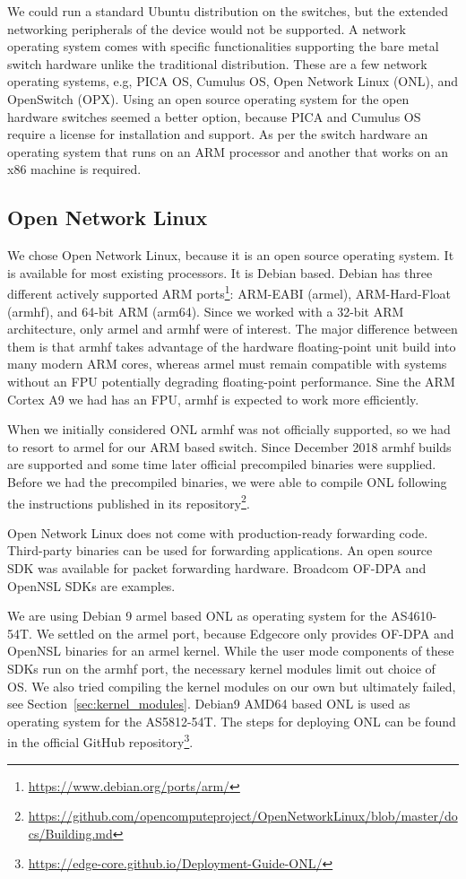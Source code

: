 \documentclass[a4paper]{article}
\begin{document}
We could run a standard Ubuntu distribution on the switches, but the extended networking peripherals of the device would not be supported. A network operating system comes with specific functionalities supporting the bare metal switch hardware unlike the traditional distribution. These are a few network operating systems, e.g, PICA OS, Cumulus OS, Open Network Linux (ONL), and OpenSwitch (OPX). Using an open source operating system for the open hardware switches seemed a better option, because PICA and Cumulus OS require a license for installation and support. As per the switch hardware an operating system that runs on an ARM processor and another that works on an x86 machine is required.

\subsection{Open Network Linux}
We chose Open Network Linux, because it is an open source operating system. It is available for most existing processors. It is Debian based. Debian has three different actively supported ARM ports\footnote{\url{https://www.debian.org/ports/arm/}}: ARM-EABI (armel), ARM-Hard-Float (armhf), and 64-bit ARM (arm64). Since we worked with a 32-bit ARM architecture, only armel and armhf were of interest. The major difference between them is that armhf takes advantage of the hardware floating-point unit build into many modern ARM cores, whereas armel must remain compatible with systems without an FPU potentially degrading floating-point performance. Sine the ARM Cortex A9 we had has an FPU, armhf is expected to work more efficiently.

When we initially considered ONL armhf was not officially supported, so we had to resort to armel for our ARM based switch. Since December 2018 armhf builds are supported and some time later official precompiled binaries were supplied. Before we had the precompiled binaries, we were able to compile ONL following the instructions published in its repository\footnote{\url{https://github.com/opencomputeproject/OpenNetworkLinux/blob/master/docs/Building.md}}.

Open Network Linux does not come with production-ready forwarding code. Third-party binaries can be used for forwarding applications. An open source SDK was available for packet forwarding hardware. Broadcom OF-DPA and OpenNSL SDKs are examples.

We are using Debian 9 armel based ONL as operating system for the AS4610-54T. We settled on the armel port, because Edgecore only provides OF-DPA and OpenNSL binaries for an armel kernel. While the user mode components of these SDKs run on the armhf port, the necessary kernel modules limit out choice of OS. We also tried compiling the kernel modules on our own but ultimately failed, see Section~\ref{sec:kernel_modules}. Debian9 AMD64 based ONL is used as operating system for the AS5812-54T. The steps for deploying ONL can be found in the official GitHub repository\footnote{\url{https://edge-core.github.io/Deployment-Guide-ONL/}}.
\end{document}
